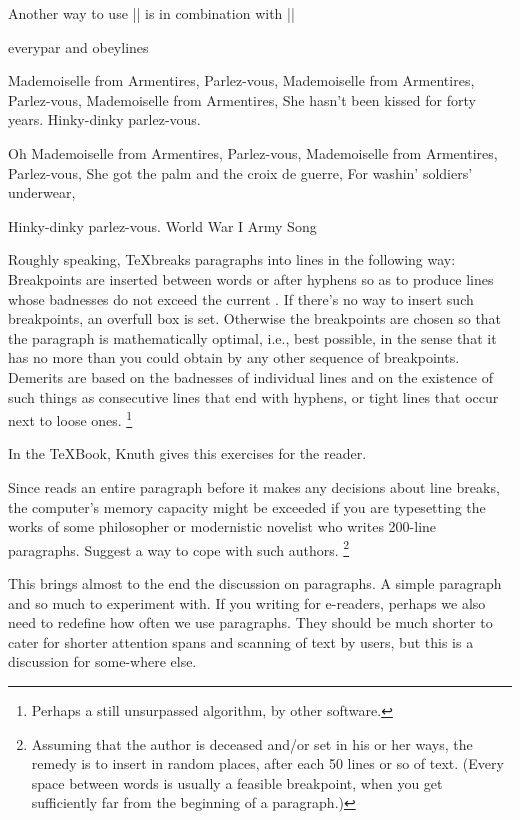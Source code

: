 \bigskip
Another way to use |\obeylines| is in combination with |\everypar|

\begin{texexample}{everypar and obeylines}{}
{\obeylines\everypar{\hfill}\parindent=0pt
Mademoiselle from Armentires, Parlez-vous,
Mademoiselle from Armentires, Parlez-vous,
Mademoiselle from Armentires,
She hasn't been kissed for forty years.
Hinky-dinky parlez-vous.

Oh Mademoiselle from Armentires, Parlez-vous,
Mademoiselle from Armentires, Parlez-vous,
She got the palm and the croix de guerre,
For washin' soldiers' underwear,

Hinky-dinky parlez-vous.
\hfil World War I Army Song\par}
\end{texexample}

Roughly speaking, \TeX breaks paragraphs into lines in the following
way: Breakpoints are inserted between words or after hyphens so as to produce
lines whose badnesses do not exceed the current . If there's no way
to insert such breakpoints, an overfull box is set. Otherwise the breakpoints are
chosen so that the paragraph is mathematically optimal, i.e., best possible, in
the sense that it has no more  than you could obtain by any other
sequence of breakpoints. Demerits are based on the badnesses of individual lines
and on the existence of such things as consecutive lines that end with hyphens,
or tight lines that occur next to loose ones.  \footnote{Perhaps a still unsurpassed algorithm, by other software.}

In the TeXBook, Knuth gives this exercises for the reader. 

\begin{latexquotation}
Since \tex reads an entire paragraph before it makes any decisions about
line breaks, the computer's memory capacity might be exceeded if you are typesetting
the works of some philosopher or modernistic novelist who writes 200-line paragraphs.
Suggest a way to cope with such authors. \footnote{Assuming that the author is deceased and/or set in his or her ways, the remedy
is to insert {   } in random places, after
each 50 lines or so of text. (Every space between words is usually a feasible breakpoint,
when you get sufficiently far from the beginning of a paragraph.)}
\end{latexquotation}

This brings almost to the end the discussion on paragraphs. A simple paragraph and so much to experiment with. If you writing for e-readers, perhaps we also need to redefine how often we use paragraphs. They should be much shorter to cater for shorter attention spans and scanning of text by users, but this is a discussion for some-where else.


